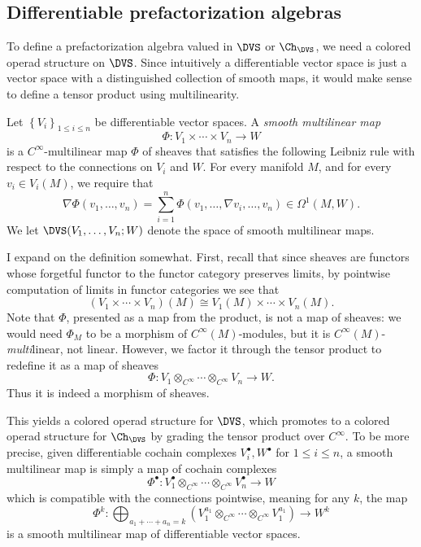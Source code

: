 \subsection{Differentiable prefactorization algebras}

To define a prefactorization algebra valued in $\DVS $ or $\Ch_{\DVS } $, we need a colored operad structure on $\DVS $. Since intuitively a differentiable vector space is just a vector space with a distinguished collection of smooth maps, it would make sense to define a tensor product using multilinearity.

\begin{definition}\label{dfn:3-5-11}
	Let $\left\{ V_i \right\} _{1\leq i\leq n}$ be differentiable vector spaces. A \emph{smooth multilinear map}
	\[
		\Phi : V_1\times \cdots \times V_n \to W
	\]
	is a $C^\infty $-multilinear map $\Phi $ of sheaves that satisfies the following Leibniz rule with respect to the connections on $V_i$ and $W$. For every manifold $M$, and for every $v_i\in V_i(M)$, we require that
	\[
		\nabla \Phi (v_1, \ldots ,v_n) = \sum_{i=1}^{n} \Phi (v_1, \ldots , \nabla v_i, \ldots ,v_n)\in\Omega ^1(M,W)
	.\]
	We let $\DVS (V_1,\ldots , V_n ; W)$ denote the space of smooth multilinear maps.
\end{definition}

\begin{discussion}\label{disc:3-5-12}
	I expand on the definition somewhat. First, recall that since sheaves are functors whose forgetful functor to the functor category preserves limits, by pointwise computation of limits in functor categories we see that
	\[
		(V_1 \times \cdots \times V_n)(M) \cong V_1(M) \times \cdots \times V_n(M)
	.\]
	Note that $\Phi $, presented as a map from the product, is not a map of sheaves: we would need $\Phi _M$ to be a morphism of $C^\infty (M)$-modules, but it is $C^\infty (M)$-\emph{multi}linear, not linear. However, we factor it through the tensor product to redefine it as a map of sheaves
	\[
		\Phi : V_1 \otimes _{C^\infty } \cdots \otimes _{C^\infty } V_n \to W
	.\]
	Thus it is indeed a morphism of sheaves.
\end{discussion}

This yields a colored operad structure for $\DVS $, which promotes to a colored operad structure for $\Ch_{\DVS } $ by grading the tensor product over $C^\infty $. To be more precise, given differentiable cochain complexes $V^{\bullet}_i, W^{\bullet} $ for $1\leq i\leq n$, a smooth multilinear map is simply a map of cochain complexes
\[
	\Phi ^{\bullet} : V^{\bullet} _1 \otimes _{C^\infty } \cdots \otimes _{C^\infty } V^{\bullet} _n \to W
\]
which is compatible with the connections pointwise, meaning for any $k$, the map
\[
	\Phi ^k : \bigoplus_{a_1 + \cdots + a_n = k}\left( V_1^{a_1} \otimes _{C^\infty} \cdots \otimes _{C^\infty} V_1^{a_1}\right) \to W^k
\]
is a smooth multilinear map of differentiable vector spaces.

